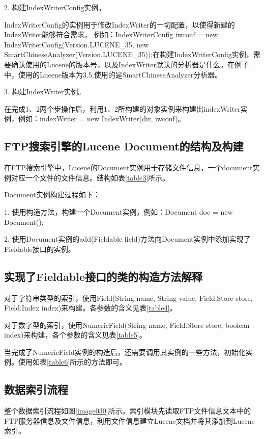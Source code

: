 2. 构建IndexWriterConfig实例。

IndexWriterConfig的实例用于修改IndexWriter的一切配置，以使得新建的Index\-Writer能够符合需求。
例如：IndexWriterConfig iwconf = new IndexWriter\-Config\-(Version.\-LUCENE\_35, new Smart\-Chinese\-Analyzer(Version.LUCENE\_35));在构建Index\-Writer\-Config实例，需要确认使用的Lucene的版本号，以及Index\-Writer默认的分析器是什么。在例子中，使用的Lucene版本为3.5,使用的是SmartChineseAnalyzer分析器。

3. 构建IndexWriter实例。

在完成1、2两个步操作后，利用1、2所构建的对象实例来构建出indexWriter实例，例如：indexWriter = new IndexWriter(dir, iwconf)。
\subsection{FTP搜索引擎的Lucene Document的结构及构建}
在FTP搜索引擎中，Lucene的Document实例用于存储文件信息，一个document实例对应一个文件的文件信息。结构如表\ref{table3}所示。
\newpage
{}

Document实例构建过程如下：

1. 使用构造方法，构建一个Document实例，例如：Document doc = new Document();

2. 使用Document实例的add(Fieldable field)方法向Document实例中添加实现了Fieldable接口的实例。
\subsection{实现了Fieldable接口的类的构造方法解释}
对于字符串类型的索引，使用Field(String name, String value, Field.Store store, Field.Index index)来构建。各参数的含义见表\ref{table4}。

\newpage
对于数字型的索引，使用NumericField(String name, Field.Store store, boolean index)来构建，各个参数的含义见表\ref{table5}。


当完成了NumericField实例的构造后，还需要调用其实例的一些方法，初始化实例。使用如表\ref{table6}所示的方法即可。


\subsection{数据索引流程}
整个数据索引流程如图\ref{image030}所示。索引模块先读取FTP文件信息文本中的FTP服务器信息及文件信息，利用文件信息建立Lucene文档并将其添加到Lucene索引。
\newpage
{}

